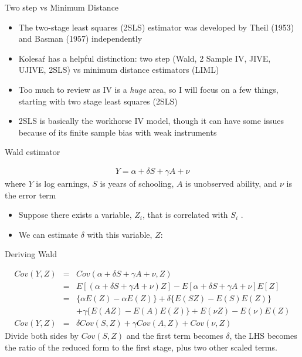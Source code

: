 \documentclass{beamer}
\begin{document}
\begin{frame}{Two step vs Minimum Distance}

\begin{itemize}
\item The two-stage least squares (2SLS) estimator was developed by Theil (1953) and Basman (1957) independently
\item Kolesa\'r has a helpful distinction: two step (Wald, 2 Sample IV, JIVE, UJIVE, 2SLS) vs minimum distance estimators (LIML)
\item Too much to review as IV is a \emph{huge} area, so I will focus on a few things, starting with two stage least squares (2SLS)
\item 2SLS is basically the workhorse IV model, though it can have some issues because of its finite sample bias with weak instruments
\end{itemize}

\end{frame}




\begin{frame}{Wald estimator}

\begin{eqnarray*}
Y = \alpha + \delta S + \gamma A + \nu
\end{eqnarray*}
where $Y$ is log earnings, $S$ is years of schooling, $A$ is unobserved ability, and $\nu$ is the error term

\begin{itemize}
	\item Suppose there exists a variable, $Z_i$, that is correlated with $S_i$ .
	\item We can estimate $\delta$ with this variable, $Z$:
\end{itemize}

\end{frame}


\begin{frame}{Deriving Wald}
	
		\begin{eqnarray*}
		Cov(Y,Z) 	&=& Cov(\alpha + \delta{S} + \gamma{A} + \nu, Z) \\
				&=&	E[(\alpha + \delta{S} + \gamma{A} + \nu)  Z] - E[\alpha + \delta{S} + \gamma{A} + \nu]E[Z] \\
				&=& \{\alpha E(Z) - \alpha E(Z) \} + \delta \{ E(SZ) - E(S)E(Z)\} \\
				&& + \gamma \{E(AZ) - E(A)E(Z) \} + E(\nu Z) - E(\nu)E(Z) \\
		Cov(Y,Z)	&=& \delta Cov(S,Z) + \gamma Cov(A,Z) + Cov(\nu,Z)
		\end{eqnarray*}
		Divide both sides by $Cov(S,Z)$ and the first term becomes $\delta$, the LHS becomes the ratio of the reduced form to the first stage, plus two other scaled terms.
\end{frame}
\end{document}
